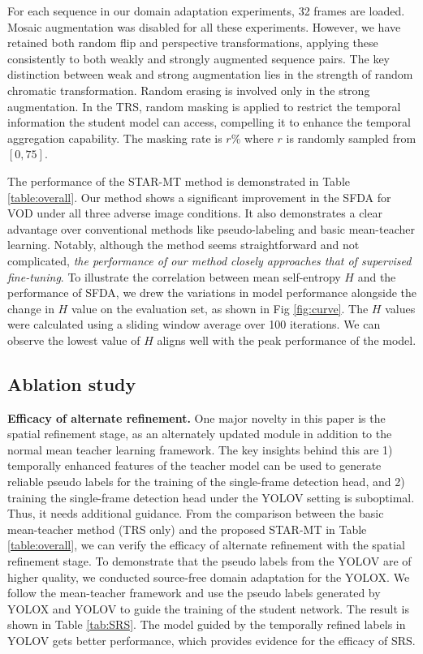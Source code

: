 For each sequence in our domain adaptation experiments, 32 frames are loaded. Mosaic augmentation was disabled for all these experiments. However, we have retained both random flip and perspective transformations, applying these consistently to both weakly and strongly augmented sequence pairs. The key distinction between weak and strong augmentation lies in the strength of random chromatic transformation. Random erasing is involved only in the strong augmentation. In the TRS, random masking is applied to restrict the temporal information the student model can access, compelling it to enhance the temporal aggregation capability. The masking rate is $r\%$ where $r$ is randomly sampled from $[0, 75]$.

The performance of the STAR-MT method is demonstrated in Table \ref{table:overall}. Our method shows a significant improvement in the SFDA for VOD under all three adverse image conditions. It also demonstrates a clear advantage over conventional methods like pseudo-labeling and basic mean-teacher learning. Notably, although the method seems straightforward and not complicated, \textit{the performance of our method closely approaches that of supervised fine-tuning}. To illustrate the correlation between mean self-entropy $H$ and the performance of SFDA, we drew the variations in model performance alongside the change in $H$ value on the evaluation set, as shown in Fig \ref{fig:curve}. The $H$ values were calculated using a sliding window average over 100 iterations. We can observe the lowest value of $H$ aligns well with the peak performance of the model.


\subsection{Ablation study}
\noindent \textbf{Efficacy of alternate refinement.} One major novelty in this paper is the spatial refinement stage, as an alternately updated module in addition to the normal mean teacher learning framework. The key insights behind this are 1) temporally enhanced features of the teacher model can be used to generate reliable pseudo labels for the training of the single-frame detection head, and 2) training the single-frame detection head under the YOLOV setting is suboptimal. Thus, it needs additional guidance. From the comparison between the basic mean-teacher method (TRS only) and the proposed STAR-MT in Table \ref{table:overall}, we can verify the efficacy of alternate refinement with the spatial refinement stage. To demonstrate that the pseudo labels from the YOLOV are of higher quality, we conducted source-free domain adaptation for the YOLOX. We follow the mean-teacher framework and use the pseudo labels generated by YOLOX and YOLOV to guide the training of the student network. The result is shown in Table \ref{tab:SRS}. The model guided by the temporally refined labels in YOLOV gets better performance, which provides evidence for the efficacy of SRS.

